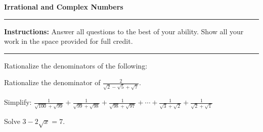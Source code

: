 \documentclass[12pt]{exam}
\newcommand{\examtitle}{Irrational and Complex Numbers}
\newcommand{\instructions}{
    \noindent\rule{\textwidth}{0.5pt}
    \begin{center}
    \textbf{Instructions:} Answer all questions to the best of your ability. Show all your work in the space provided for full credit.
    \end{center}
    \noindent\rule{\textwidth}{0.5pt}
}
\begin{document}
\begin{center}
\textbf{\Large \examtitle} \\
\vspace{0.5cm}
\hspace{0.1\textwidth}
\end{center}

\instructions
\vspace{0.5cm}

\begin{questions}

\pointsinrightmargin

\question[8]
Rationalize the denominators of the following:

\question[10]
Rationalize the denominator of $\frac{2}{\sqrt{2} - \sqrt{5} + \sqrt{7}}$.
\vspace*{4cm}

\question[12]
Simplify: $\frac{1}{\sqrt{100} + \sqrt{99}} + \frac{1}{\sqrt{99} + \sqrt{98}} + \frac{1}{\sqrt{98} + \sqrt{97}} + \cdots + \frac{1}{\sqrt{3} + \sqrt{2}} + \frac{1}{\sqrt{2} + \sqrt{1}}$
\vspace*{5cm}

\question[8]
Solve $3 - 2\sqrt{x} = 7$.
\vspace*{3cm}


\end{questions}
\end{document}
